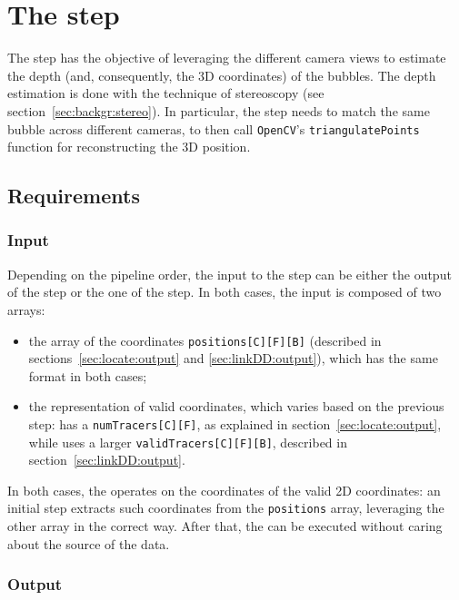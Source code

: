 \chapter{The \match* step}
\label{chap:matching}

The \match* step has the objective of leveraging the different camera views to estimate the depth (and, consequently, the 3D coordinates) of the bubbles.
The depth estimation is done with the technique of stereoscopy (see section~\ref{sec:backgr:stereo}).
In particular, the \match* step needs to match the same bubble across different cameras, to then call \texttt{OpenCV}'s \texttt{triangulatePoints} function for reconstructing the 3D position.

\section{Requirements}

\subsection{Input}

Depending on the pipeline order, the input to the \match* step can be either the output of the \locate* step or the one of the \linkDD* step.
In both cases, the input is composed of two arrays:
\begin{itemize}
	\itemsep 0em
	\item the array of the coordinates \texttt{positions[C][F][B]} (described in sections~\ref{sec:locate:output} and \ref{sec:linkDD:output}), which has the same format in both cases;
	\item the representation of valid coordinates, which varies based on the previous step: \locate* has a \texttt{numTracers[C][F]}, as explained in section~\ref{sec:locate:output}, while \linkDD* uses a larger \texttt{validTracers[C][F][B]}, described in section~\ref{sec:linkDD:output}.
\end{itemize}
In both cases, the \match* operates on the coordinates of the valid 2D coordinates: an initial step extracts such coordinates from the \texttt{positions} array, leveraging the other array in the correct way.
After that, the \match* can be executed without caring about the source of the data.

\subsection{Output}
\label{sec:match:output}

